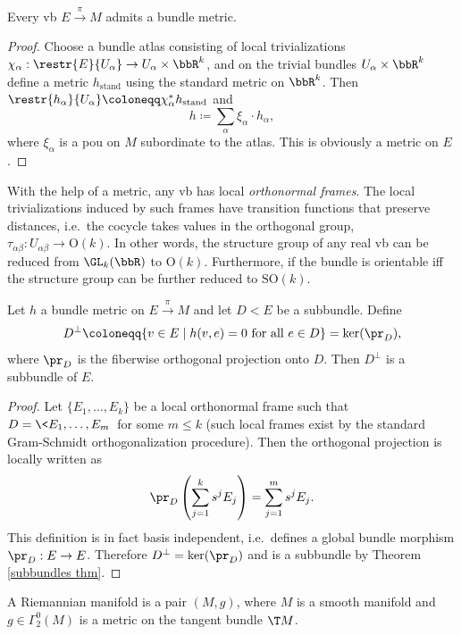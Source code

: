 \begin{thm}
Every \gls{vb} $E\overset\pi\to M$ admits a bundle metric. 
\end{thm}
\begin{proof}
Choose a bundle atlas consisting of local trivializations $\chi_\alpha:\restr{E}{U_\alpha}\to U_\alpha\times\bbR^k$, and on the trivial bundles $U_\alpha\times\bbR^k$ define a metric $h_{\text{stand}}$ using the standard metric on $\bbR^k$. Then $\restr{h_\alpha}{U_\alpha}\coloneqq \chi_\alpha^\ast h_{\text{stand}}$ and 
\[h\coloneqq \sum_\alpha \xi_\alpha \cdot h_\alpha,\]
where $\xi_\alpha$ is a \gls{pou} on $M$ subordinate to the atlas. This is obviously a metric on $E$.
\end{proof}
\begin{cor}
With the help of a metric, any \gls{vb} has local \emph{orthonormal frames}. The local trivializations induced by such frames have transition functions that preserve distances, i.e.\ the cocycle takes values in the orthogonal group, $\tau_{\alpha\beta}:U_{\alpha\beta}\to \mathrm{O}(k)$. In other words, the structure group of any real \gls{vb} can be reduced from $\GL_k(\bbR )$ to $\mathrm{O}(k)$. Furthermore, if the bundle is orientable iff the structure group can be further reduced to $\mathrm{SO}(k)$.
\end{cor}

\begin{prop}
Let $h$ a bundle metric on $E\overset\pi\to M$ and let $D< E$ be a subbundle. Define
\[D^\perp \coloneqq \{v\in E\mid h(v,e)=0 \text{ for all }e\in D\}=\ker (\pr_D),\]
where $\pr_D$ is the fiberwise orthogonal projection onto $D$. Then $D^\perp$ is a subbundle of $E$.
\end{prop}
\begin{proof}
Let $\{E_1,\ldots,E_k\}$ be a local orthonormal frame such that $D=\<E_1,\ldots,E_m\>$ for some $m\leq k$ (such local frames exist by the standard Gram-Schmidt orthogonalization procedure). Then the orthogonal projection is locally written as
\[\pr_D \left(\sum_{j=1}^k s^j E_j\right)=\sum_{j=1}^m s^j E_j.\]
This definition is in fact basis independent, i.e.\ defines a global bundle morphism $\pr_D:E\to E$. Therefore $D^\perp =\ker (\pr_D)$ and is a subbundle by Theorem \ref{subbundles thm}.
\end{proof}


\begin{defn}
A Riemannian manifold is a pair $(M,g)$, where $M$ is a smooth manifold and $g\in\Gamma^0_2(M)$ is a metric on the tangent bundle $\T M$.
\end{defn}


